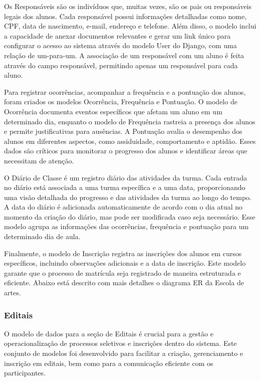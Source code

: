 Os Responsáveis são os indivíduos que, muitas vezes, são os pais ou responsáveis legais dos alunos. Cada responsável possui informações detalhadas como nome, CPF, data de nascimento, e-mail, endereço e telefone. Além disso, o modelo inclui a capacidade de anexar documentos relevantes e gerar um link único para configurar o acesso ao sistema através do modelo User do Django, com uma relação de um-para-um. A associação de um responsável com um aluno é feita através do campo responsável, permitindo apenas um responsável para cada aluno.

Para registrar ocorrências, acompanhar a frequência e a pontuação dos alunos, foram criados os modelos Ocorrência, Frequência e Pontuação. O modelo de Ocorrência documenta eventos específicos que afetam um aluno em um determinado dia, enquanto o modelo de Frequência rastreia a presença dos alunos e permite justificativas para ausências. A Pontuação avalia o desempenho dos alunos em diferentes aspectos, como assiduidade, comportamento e aptidão. Esses dados são críticos para monitorar o progresso dos alunos e identificar áreas que necessitam de atenção.

O Diário de Classe é um registro diário das atividades da turma. Cada entrada no diário está associada a uma turma específica e a uma data, proporcionando uma visão detalhada do progresso e das atividades da turma ao longo do tempo. A data do diário é adicionada automaticamente de acordo com o dia atual no momento da criação do diário, mas pode ser modificada caso seja necessário. Esse modelo agrupa as informações das ocorrências, frequência e pontuação para um determinado dia de aula.

Finalmente, o modelo de Inscrição registra as inscrições dos alunos em cursos específicos, incluindo observações adicionais e a data de inscrição. Este modelo garante que o processo de matrícula seja registrado de maneira estruturada e eficiente. Abaixo está descrito com mais detalhes o diagrama ER da Escola de artes.

\subsubsection{Editais}

O modelo de dados para a seção de Editais é crucial para a gestão e operacionalização de processos seletivos e inscrições dentro do sistema. Este conjunto de modelos foi desenvolvido para facilitar a criação, gerenciamento e inscrição em editais, bem como para a comunicação eficiente com os participantes.

